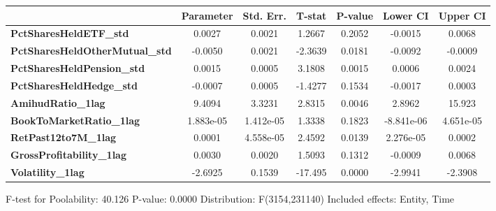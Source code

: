 \begin{center}
\begin{tabular}{lclc}
\bottomrule
\end{tabular}
\begin{tabular}{lcccccc}
                                       & \textbf{Parameter} & \textbf{Std. Err.} & \textbf{T-stat} & \textbf{P-value} & \textbf{Lower CI} & \textbf{Upper CI}  \\
\midrule
\textbf{PctSharesHeldETF\_std}         &       0.0027       &       0.0021       &      1.2667     &      0.2052      &      -0.0015      &       0.0068       \\
\textbf{PctSharesHeldOtherMutual\_std} &      -0.0050       &       0.0021       &     -2.3639     &      0.0181      &      -0.0092      &      -0.0009       \\
\textbf{PctSharesHeldPension\_std}     &       0.0015       &       0.0005       &      3.1808     &      0.0015      &       0.0006      &       0.0024       \\
\textbf{PctSharesHeldHedge\_std}       &      -0.0007       &       0.0005       &     -1.4277     &      0.1534      &      -0.0017      &       0.0003       \\
\textbf{AmihudRatio\_1lag}             &       9.4094       &       3.3231       &      2.8315     &      0.0046      &       2.8962      &       15.923       \\
\textbf{BookToMarketRatio\_1lag}       &     1.883e-05      &     1.412e-05      &      1.3338     &      0.1823      &     -8.841e-06    &     4.651e-05      \\
\textbf{RetPast12to7M\_1lag}           &       0.0001       &     4.558e-05      &      2.4592     &      0.0139      &     2.276e-05     &       0.0002       \\
\textbf{GrossProfitability\_1lag}      &       0.0030       &       0.0020       &      1.5093     &      0.1312      &      -0.0009      &       0.0068       \\
\textbf{Volatility\_1lag}              &      -2.6925       &       0.1539       &     -17.495     &      0.0000      &      -2.9941      &      -2.3908       \\
\bottomrule
\end{tabular}
\end{center}

F-test for Poolability: 40.126 \newline
 P-value: 0.0000 \newline
 Distribution: F(3154,231140) \newline
  \newline
 Included effects: Entity, Time